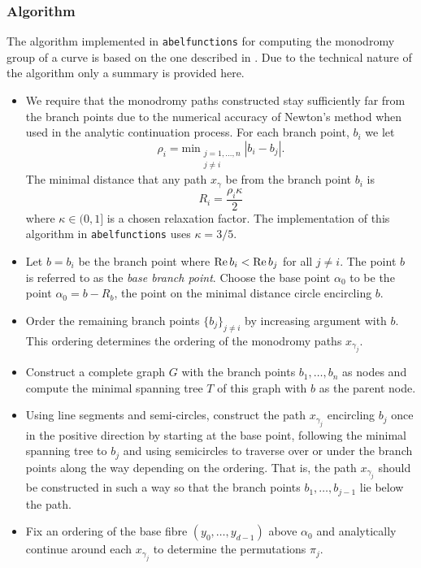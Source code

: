 %
\subsubsection*{Algorithm}
%

The algorithm implemented in {\tt abelfunctions} for computing the monodromy
group of a curve is based on the one described in \cite{FKS12}. Due to the
technical nature of the algorithm only a summary is provided here.

\begin{itemize}
\item We require that the monodromy paths constructed stay sufficiently far from
  the branch points due to the numerical accuracy of Newton's method when used
  in the analytic continuation process. For each branch point, $b_i$ we let
  \[
    \rho_i = \text{min}_{\substack{j=1,\ldots,n \\ j\neq i}} |b_i - b_j|.
  \]
  The minimal distance that any path $x_\gamma$ be from the branch point $b_i$
  is
  \[
    R_i = \frac{\rho_i \kappa}{2}
  \]
  where $\kappa \in (0,1]$ is a chosen relaxation factor. The implementation of
  this algorithm in {\tt abelfunctions} uses $\kappa = 3/5$.
\item Let $b = b_i$ be the branch point where $\operatorname{\text{Re}} b_i < \operatorname{\text{Re}} b_j$ for all $j
  \neq i$. The point $b$ is referred to as the {\it base branch point}. Choose
  the base point $\alpha_0$ to be the point $\alpha_0 = b - R_b$, the point on
  the minimal distance circle encircling $b$.
\item Order the remaining branch points $\{b_j\}_{j \neq i}$ by increasing
  argument with $b$. This ordering determines the ordering of the monodromy
  paths $x_{\gamma_j}$.
\item Construct a complete graph $G$ with the branch points $b_1,\ldots,b_n$ as
  nodes and compute the minimal spanning tree $T$ of this graph with $b$ as the
  parent node.
\item Using line segments and semi-circles, construct the path $x_{\gamma_j}$
  encircling $b_j$ once in the positive direction by starting at the base point,
  following the minimal spanning tree to $b_j$ and using semicircles to traverse
  over or under the branch points along the way depending on the ordering. That
  is, the path $x_{\gamma_j}$ should be constructed in such a way so that the
  branch points $b_1,\ldots,b_{j-1}$ lie below the path.
\item Fix an ordering of the base fibre $(y_0,\ldots,y_{d-1})$ above $\alpha_0$
  and analytically continue around each $x_{\gamma_j}$ to determine the
  permutations $\pi_j$.
\end{itemize}

